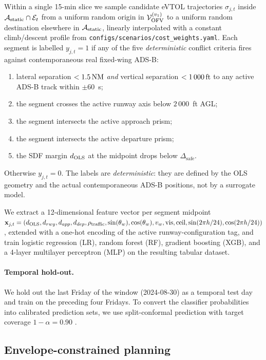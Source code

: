 Within a single 15-min slice we sample candidate eVTOL trajectories
$\sigma_{j,t}$ inside $\mathcal{A}_{\mathrm{static}} \cap \mathcal{E}_t$ from a uniform random origin in
$\mathcal{V}_{\mathrm{OFV}}^{(v_1)}$ to a uniform random destination elsewhere in $\mathcal{A}_{\mathrm{static}}$,
linearly interpolated with a constant climb/descent profile from
\texttt{configs/scenarios/cost\_weights.yaml}. Each segment is labelled
$y_{j,t} = 1$ if any of the five \emph{deterministic} conflict criteria fires
against contemporaneous real fixed-wing ADS-B:
\begin{enumerate}
    \item lateral separation $< 1.5\,\mathrm{NM}$ \emph{and} vertical separation
    $< 1\,000\,\mathrm{ft}$ to any active ADS-B track within $\pm 60$~s;
    \item the segment crosses the active runway axis below $2\,000$~ft AGL;
    \item the segment intersects the active approach prism;
    \item the segment intersects the active departure prism;
    \item the SDF margin $d_{\mathrm{OLS}}$ at the midpoint drops below
    $\Delta_{\mathrm{safe}}$.
\end{enumerate}
Otherwise $y_{j,t} = 0$. The labels are \emph{deterministic}: they are
defined by the OLS geometry and the actual contemporaneous ADS-B positions,
not by a surrogate model.

We extract a 12-dimensional feature vector per segment midpoint
\(\mathbf{x}_{j,t}=(d_{\mathrm{OLS}}, d_{rwy}, d_{app}, d_{dep},
\rho_{\mathrm{traffic}},
\sin(\theta_w), \cos(\theta_w),
v_w, \mathrm{vis}, \mathrm{ceil}, \sin(2\pi h/24), \cos(2\pi h/24))\),
extended with a one-hot encoding of the active runway-configuration tag, and
train logistic regression (LR), random forest (RF), gradient boosting (XGB),
and a 4-layer multilayer perceptron (MLP) on the resulting tabular dataset.

\paragraph{Temporal hold-out.}
We hold out the last Friday of the window (2024-08-30) as a temporal test
day and train on the preceding four Fridays. To convert the classifier
probabilities into calibrated prediction sets, we use split-conformal
prediction with target coverage $1-\alpha = 0.90$
\citep{vovk_conformal,angelopoulos2021gentle}.

\subsection{Envelope-constrained planning}
\label{sec:method-planner}

